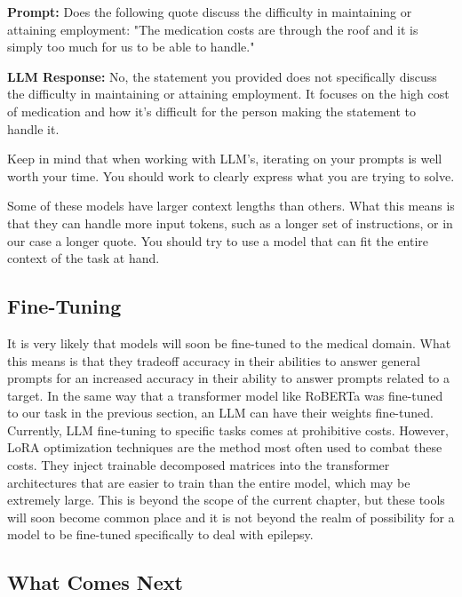 \begin{displayquote}
  \textbf{Prompt:} Does the following quote discuss the difficulty in maintaining or attaining employment: "The medication costs are through the roof and it is simply too much for us to be able to handle."
\end{displayquote}

\begin{displayquote}
  \textbf{LLM Response:} No, the statement you provided does not specifically discuss the difficulty in maintaining or attaining employment. It focuses on the high cost of medication and how it's difficult for the person making the statement to handle it.
\end{displayquote}

Keep in mind that when working with LLM's, iterating on your prompts is well worth your time. You should work to clearly express what you are trying to solve.

Some of these models have larger context lengths than others. What this means is that they can handle more input tokens, such as a longer set of instructions, or in our case a longer quote.
You should try to use a model that can fit the entire context of the task at hand.

\subsection{Fine-Tuning}

It is very likely that models will soon be fine-tuned to the medical domain. What this means is that they tradeoff accuracy in their abilities to answer general prompts for an increased accuracy in their ability to answer prompts related to a target.
In the same way that a transformer model like RoBERTa was fine-tuned to our task in the previous section, an LLM can have their weights fine-tuned.
Currently, LLM fine-tuning to specific tasks comes at prohibitive costs. However, LoRA\cite{hu2021lora} optimization techniques are the method most often used to combat these costs. They inject trainable decomposed matrices into the transformer architectures that
are easier to train than the entire model, which may be extremely large.
This is beyond the scope of the current chapter, but these tools will soon become common place and it is not beyond the realm of possibility for a model to be fine-tuned specifically to deal with
epilepsy.

\subsection{What Comes Next}

